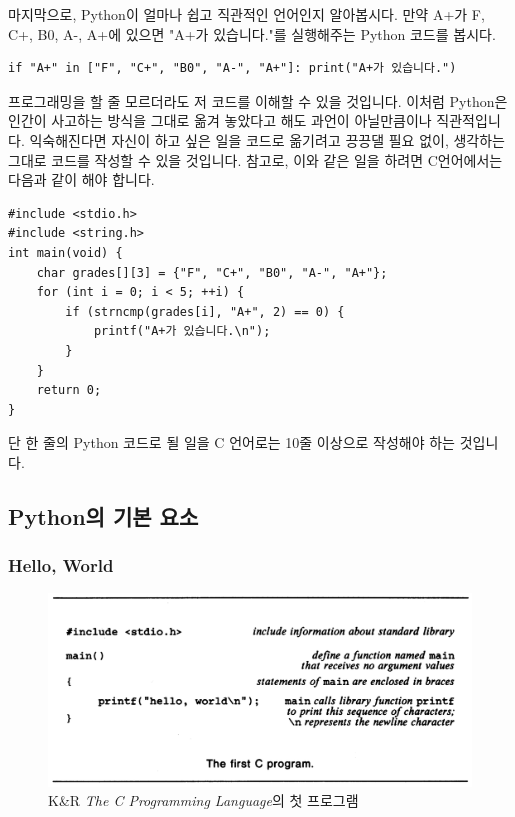 \documentclass[../main.tex]{subfiles}
\begin{document}
마지막으로, Python이 얼마나 쉽고 직관적인 언어인지 알아봅시다.
만약 A+가 F, C+, B0, A-, A+에 있으면 "A+가 있습니다."를 실행해주는 Python 코드를 봅시다.
\begin{verbatim}
if "A+" in ["F", "C+", "B0", "A-", "A+"]: print("A+가 있습니다.")
\end{verbatim}
프로그래밍을 할 줄 모르더라도 저 코드를 이해할 수 있을 것입니다.
이처럼 Python은 인간이 사고하는 방식을 그대로 옮겨 놓았다고 해도 과언이 아닐만큼이나 직관적입니다.
익숙해진다면 자신이 하고 싶은 일을 코드로 옮기려고 끙끙댈 필요 없이, 생각하는 그대로 코드를 작성할 수 있을 것입니다.
참고로, 이와 같은 일을 하려면 C언어에서는 다음과 같이 해야 합니다.
\begin{verbatim}
#include <stdio.h>
#include <string.h>
int main(void) {
    char grades[][3] = {"F", "C+", "B0", "A-", "A+"};
    for (int i = 0; i < 5; ++i) {
        if (strncmp(grades[i], "A+", 2) == 0) {
            printf("A+가 있습니다.\n");
        }
    }
    return 0;
}
\end{verbatim}
단 한 줄의 Python 코드로 될 일을 C 언어로는 10줄 이상으로 작성해야 하는 것입니다.

\subsection{Python의 기본 요소}
\subsubsection{Hello, World}

\begin{figure}[htpb]
  \centering
  \includegraphics[width=0.8\linewidth]{./figures/hello_world.png}
  \caption*{K\&R \textit{The C Programming Language}의 첫 프로그램}
\end{figure}
\end{document}
